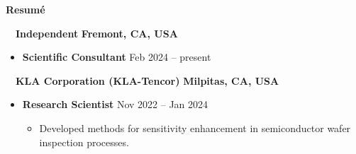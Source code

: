 \documentclass[10.5pt]{article}
\begin{document}
\begin{center}
	\textbf{Resum\'{e}}
\end{center}
\begin{minipage}[t]{0.85\textwidth}\vspace{0pt}
    \vspace{0.3cm}
\end{minipage}
\begin{minipage}[t]{0.15\textwidth}\vspace{0pt}
\end{minipage}
\vspace{-0.1cm} 
~~{\color{black}\textbf{Independent} \hfill  \textbf{Fremont, CA, USA}}\par
\begin{itemize}
    \item
        \textbf{Scientific Consultant}
        \hfill  {Feb 2024 -- present} \par
\end{itemize} 

~~{\color{black}\textbf{KLA Corporation (KLA-Tencor)} \hfill  \textbf{Milpitas, CA, USA}}\par
\begin{itemize}
    \item
        \textbf{Research Scientist}
        \hfill  {Nov 2022 -- Jan 2024} \par
        \begin{itemize}
            \item Developed methods for sensitivity enhancement in semiconductor wafer inspection processes. 
        \end{itemize}
\end{itemize} 
\end{document}

